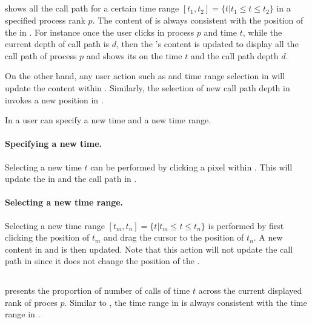 \subsection{\depthview}
\label{sec:depthview}

\depthview{} shows all the call path for a certain time range $[t_1,t_2]= \{t | t_1\leq t\leq t_2\}$ in a specified process rank $p$. The content of \depthview{} is always consistent with the position of the \crosshair{} in \traceview{}.
For instance once the user clicks in process $p$ and time $t$, while the current depth of call path is $d$, then the \depthview's content is updated to display all the call path of process $p$ and shows its \crosshair{} on the time $t$ and the call path depth $d$.

On the other hand, any user action such as \crosshair{} and time range selection in \depthview{} will update the content within \traceview. Similarly, the selection of new call path depth in \callview{} invokes a new position in \depthview.

In \depthview{} a user can specify a new \crosshair{} time and a new time range.
\paragraph{Specifying a new \crosshair{} time.} Selecting a new \crosshair{} time $t$ can be performed by clicking a pixel within \depthview{}. This will update the \crosshair{} in \traceview{} and the call path in \callview.

\paragraph{Selecting a new time range.} Selecting a new time range $[t_m,t_n]= \{t | t_m\leq t\leq t_n\}$ is performed by first clicking the position of $t_m$ and drag the cursor to the position of $t_n$. A new content in \depthview{} and \traceview{} is then updated. Note that this action will not update the call path in \callview{} since it does not change the position of the \crosshair.


\subsection{\summaryview}
\label{sec:summaryview}

\summaryview{} presents the proportion of number of calls of time $t$ across the current displayed rank of proces $p$. 
Similar to \depthview, the time range in \summaryview{} is always consistent with the time range in \traceview{}.


